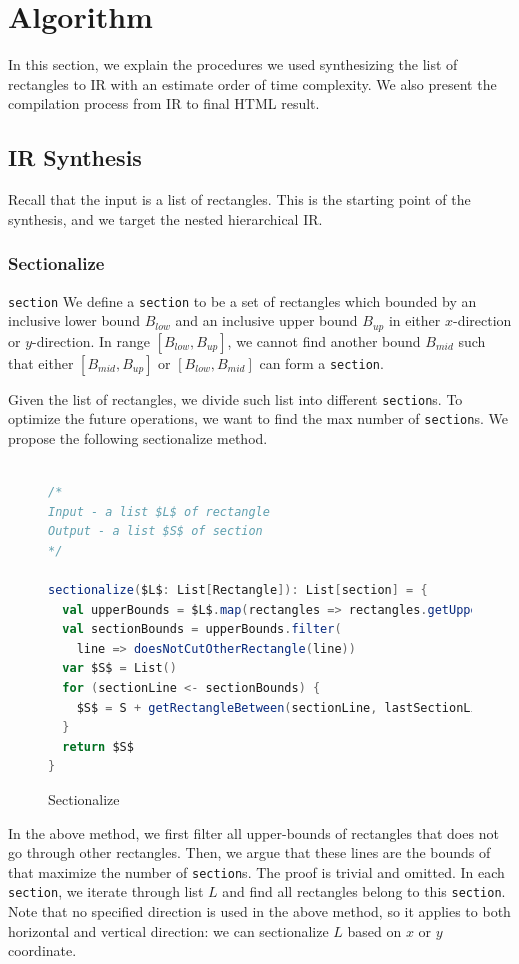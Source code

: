 \documentclass[runningheads]{llncs}
\begin{document}
\section{Algorithm}
In this section, we explain the procedures we used synthesizing the list of rectangles to IR with an estimate order of time complexity. We also present the compilation process from IR to final HTML result.
\subsection{IR Synthesis}
Recall that the input is a list of rectangles. This is the starting point of the synthesis, and we target the nested hierarchical IR. 

\subsubsection{Sectionalize} 
\begin{definition}{\lstinline{section}}
  We define a \lstinline{section} to be a set of rectangles which bounded by an inclusive lower bound $B_{low}$ and an inclusive upper bound $B_{up}$ in either $x$-direction or $y$-direction. In range $[B_{low}, B_{up}]$, we cannot find another bound $B_{mid}$ such that either $[B_{mid}, B_{up}]$ or $[B_{low}, B_{mid}]$ can form a \lstinline{section}.
\end{definition}

Given the list of rectangles, we divide such list into different \lstinline{section}s. To optimize the future operations, we want to find the max number of \lstinline{section}s. We propose the following sectionalize method.

\begin{figure}[H]
  \vspace*{-0.4in}
  \begin{lstlisting}[language=Scala,mathescape=true]

/*
Input - a list $L$ of rectangle
Output - a list $S$ of section
*/

sectionalize($L$: List[Rectangle]): List[section] = {
  val upperBounds = $L$.map(rectangles => rectangles.getUpperBound())
  val sectionBounds = upperBounds.filter(
    line => doesNotCutOtherRectangle(line))
  var $S$ = List()
  for (sectionLine <- sectionBounds) {
    $S$ = S + getRectangleBetween(sectionLine, lastSectionLine)
  }
  return $S$ 
}
  \end{lstlisting}
\caption{Sectionalize}
\end{figure}
In the above method, we first filter all upper-bounds of rectangles that does not go through other rectangles. Then, we argue that these lines are the bounds of that maximize the number of \lstinline{section}s. The proof is trivial and omitted. In each \lstinline{section}, we iterate through list $L$ and find all rectangles belong to this \lstinline{section}. Note that no specified direction is used in the above method, so it applies to both horizontal and vertical direction: we can sectionalize $L$ based on $x$ or $y$ coordinate.
\end{document}
